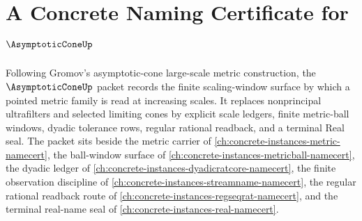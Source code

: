 \chapter{A Concrete Naming Certificate for $\AsymptoticConeUp$}
\label{ch:concrete-instances-asymptotic-cone-namecert}

Following Gromov's asymptotic-cone large-scale metric construction, the $\AsymptoticConeUp$ packet records the finite scaling-window surface by which a pointed metric family is read at increasing scales. It replaces nonprincipal ultrafilters and selected limiting cones by explicit scale ledgers, finite metric-ball windows, dyadic tolerance rows, regular rational readback, and a terminal Real seal. The packet sits beside the metric carrier of \autoref{ch:concrete-instances-metric-namecert}, the ball-window surface of \autoref{ch:concrete-instances-metricball-namecert}, the dyadic ledger of \autoref{ch:concrete-instances-dyadicratcore-namecert}, the finite observation discipline of \autoref{ch:concrete-instances-streamname-namecert}, the regular rational readback route of \autoref{ch:concrete-instances-regseqrat-namecert}, and the terminal real-name seal of \autoref{ch:concrete-instances-real-namecert}.

